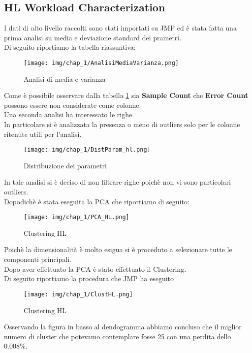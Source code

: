 \subsection{HL Workload Characterization}
I dati di alto livello raccolti sono stati importati su JMP ed è stata fatta una prima analisi su media e deviazione standard dei prametri.\\
Di seguito riportiamo la tabella riassuntiva:

\begin{figure}[H]
    \centering
    \texttt{[image: img/chap\_1/AnalisiMediaVarianza.png]}
    \caption{Analisi di media e varianza}
    \label{fig:m_vanal}
\end{figure}
\noindent
Come è possibile osservare dalla tabella \ref{fig:m_vanal} sia \textbf{Sample Count} che \textbf{Error Count} possono essere non considerate come colonne.\\
Una seconda analisi ha interessato le righe.\\
In particolare si è analizzata la presenza o meno di outliers solo per le colonne ritenute utili per l'analisi.\\
\begin{figure}[H]
    \centering
    \texttt{[image: img/chap\_1/DistParam\_hl.png]}
    \caption{Distribuzione dei parametri}
    \label{fig:dist_param}
\end{figure}
\noindent
In tale analisi si è deciso di non filtrare righe poichè non vi sono particolari outliers.\\
Dopodichè è stata eseguita la PCA che riportiamo di seguito:
\begin{figure}[H]
    \centering
    \texttt{[image: img/chap\_1/PCA\_HL.png]}
    \caption{Clustering HL}
    \label{fig:clust_hl}
\end{figure}
\noindent
Poichè la dimensionalità è molto esigua  si è proceduto a selezionare tutte le componenti principali.\\
Dopo aver effettuato la PCA è stato effettuato il Clustering.\\
Di seguito riportiamo la procedura che JMP ha eseguito 
\begin{figure}[H]
    \centering
    \texttt{[image: img/chap\_1/ClustHL.png]}
    \caption{Clustering HL}
    \label{fig:clust_hl}
\end{figure}
\noindent
Osservando la figura in basso al dendogramma abbiamo concluso che il miglior numero di cluster che potevamo contemplare fosse 25 con una perdita dello 0.008\%.\\
